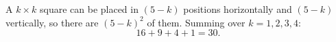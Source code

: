 A $k\times k$ square can be placed in $(5-k)$ positions horizontally and $(5-k)$ vertically, so there are $(5-k)^2$ of them. Summing over $k=1,2,3,4$:
\[
16+9+4+1=\boxed{30}.
\]
